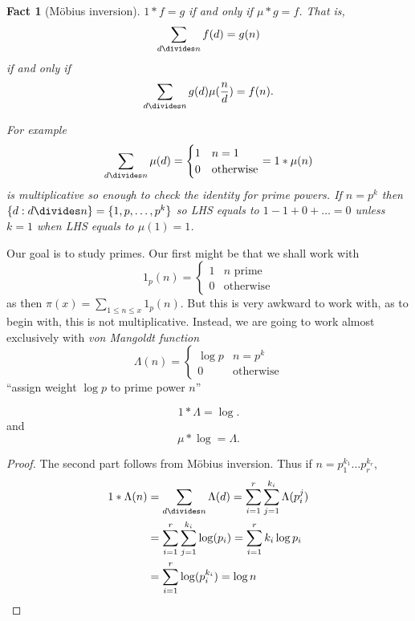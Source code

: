 \documentclass[a4paper]{article}
\newtheorem*{fact}{Fact}
\begin{document}
\begin{fact}[Möbius inversion]
  \(1 * f = g\) if and only if \(\mu * g = f\). That is,
  \[
    \sum_{d \divides n} f(d) = g(n)
  \]
  if and only if
  \[
    \sum_{d \divides n} g(d) \mu(\frac{n}{d}) = f(n).
  \]

  For example
  \[
    \sum_{d \divides n} \mu(d) =
    \begin{cases}
      1 & n = 1 \\
      0 & \text{otherwise}
    \end{cases}
    = 1 * \mu (n)
  \]
  is multiplicative so enough to check the identity for prime powers. If \(n = p^k\) then \(\{d: d \divides n\} = \{1, p, \dots, p^k\}\) so LHS equals to \(1 - 1 + 0 + \dots = 0\) unless \(k = 1\) when LHS equals to \(\mu(1) = 1\).
\end{fact}

Our goal is to study primes. Our first might be that we shall work with
\[
  1_p(n) =
  \begin{cases}
    1 & n \text{ prime} \\
    0 & \text{otherwise}
  \end{cases}
\]
as then \(\pi(x) = \sum_{1 \leq n \leq x} 1_p(n)\). But this is very awkward to work with, as to begin with, this is not multiplicative. Instead, we are going to work almost exclusively with \emph{von Mangoldt function}
\[
  \Lambda(n) =
  \begin{cases}
    \log p & n = p^k \\
    0 & \text{otherwise}
  \end{cases}
\]
``assign weight \(\log p\) to prime power \(n\)''

\begin{lemma}
  \[
    1 * \Lambda = \log.
  \]
  and
  \[
    \mu * \log = \Lambda.
  \]
\end{lemma}

\begin{proof}
  The second part follows from Möbius inversion. Thus if \(n = p_1^{k_1} \dots p_r^{k_r}\),
  \begin{align*}
    1 * \Lambda(n)
    &= \sum_{d \divides n} \Lambda(d)
    = \sum_{i = 1}^r \sum_{j = 1}^{k_i} \Lambda(p_i^j) \\
    &= \sum_{i = 1}^r \sum_{j = 1}^{k_i} \log(p_i)
    = \sum_{i = 1}^r k_i \log p_i \\
    &= \sum_{i = 1}^r \log (p_i^{k_i})
    = \log n
  \end{align*}
\end{proof}
\end{document}
